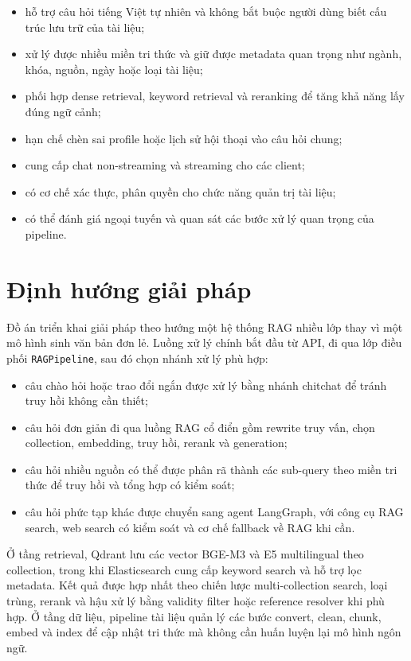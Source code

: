 \documentclass[../DoAn.tex]{subfiles}
\begin{document}
\begin{itemize}
    \item hỗ trợ câu hỏi tiếng Việt tự nhiên và không bắt buộc người dùng biết
    cấu trúc lưu trữ của tài liệu;
    \item xử lý được nhiều miền tri thức và giữ được metadata quan trọng như
    ngành, khóa, nguồn, ngày hoặc loại tài liệu;
    \item phối hợp dense retrieval, keyword retrieval và reranking để tăng khả
    năng lấy đúng ngữ cảnh;
    \item hạn chế chèn sai profile hoặc lịch sử hội thoại vào câu hỏi chung;
    \item cung cấp chat non-streaming và streaming cho các client;
    \item có cơ chế xác thực, phân quyền cho chức năng quản trị tài liệu;
    \item có thể đánh giá ngoại tuyến và quan sát các bước xử lý quan trọng của
    pipeline.
\end{itemize}

\section{Định hướng giải pháp}
\label{sec:dinhhuong}

Đồ án triển khai giải pháp theo hướng một hệ thống RAG nhiều lớp thay vì một mô
hình sinh văn bản đơn lẻ. Luồng xử lý chính bắt đầu từ API, đi qua lớp điều phối
\texttt{RAGPipeline}, sau đó chọn nhánh xử lý phù hợp:

\begin{itemize}
    \item câu chào hỏi hoặc trao đổi ngắn được xử lý bằng nhánh chitchat để tránh
    truy hồi không cần thiết;
    \item câu hỏi đơn giản đi qua luồng RAG cổ điển gồm rewrite truy vấn, chọn
    collection, embedding, truy hồi, rerank và generation;
    \item câu hỏi nhiều nguồn có thể được phân rã thành các sub-query theo miền
    tri thức để truy hồi và tổng hợp có kiểm soát;
    \item câu hỏi phức tạp khác được chuyển sang agent LangGraph, với công cụ RAG
    search, web search có kiểm soát và cơ chế fallback về RAG khi cần.
\end{itemize}

Ở tầng retrieval, Qdrant lưu các vector BGE-M3 và E5 multilingual theo collection,
trong khi Elasticsearch cung cấp keyword search và hỗ trợ lọc metadata. Kết quả
được hợp nhất theo chiến lược multi-collection search, loại trùng, rerank và hậu
xử lý bằng validity filter hoặc reference resolver khi phù hợp. Ở tầng dữ liệu,
pipeline tài liệu quản lý các bước convert, clean, chunk, embed và index để cập
nhật tri thức mà không cần huấn luyện lại mô hình ngôn ngữ.
\end{document}
